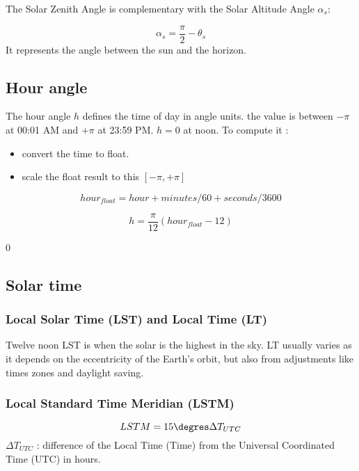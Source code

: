 \documentclass[12pt,a4paper]{article}
\begin{document}
The Solar Zenith Angle is complementary with the Solar Altitude Angle $\alpha_s$:

\begin{equation}
	\alpha_s = \frac{\pi}{2} - \theta_s
\end{equation}
It represents the angle between the sun and the horizon. 

\subsection{Hour angle}
The hour angle $h$ defines the time of day in angle units.
the value is between $-\pi$ at 00:01 AM and $+\pi$ at 23:59 PM. $h=0$ at noon. 
To compute it : 
\begin{itemize}
	\item convert the time to float.
	\item scale the float result to this $[-\pi, +\pi]$
\end{itemize}

\begin{equation}
	hour_{float} = hour + minutes / 60 + seconds / 3600
\end{equation}

\begin{equation}
	h = \frac{\pi}{12}(hour_{float} - 12)
\end{equation}

0\subsection{Solar time}

\subsubsection{Local Solar Time (LST) and Local Time (LT)}
Twelve noon LST is when the solar is the highest in the sky. LT usually varies as it depends on the eccentricity of the Earth's orbit, but also from adjustments like times zones and daylight saving. 

\subsubsection{Local Standard Time Meridian (LSTM)}
\begin{equation}
	LSTM = 15 \degres \Delta{T_{UTC}}
\end{equation}
$\Delta{T_{UTC}}$ : difference of the Local Time (Time) from the Universal Coordinated Time (UTC) in hours. 
\end{document}

